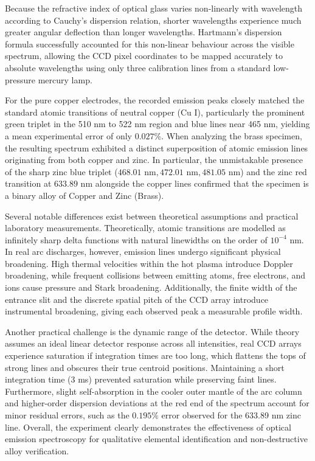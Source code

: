 \documentclass[12pt, a4paper]{article}
\begin{document}
Because the refractive index of optical glass varies non-linearly with wavelength according to Cauchy's dispersion relation, shorter wavelengths experience much greater angular deflection than longer wavelengths. Hartmann's dispersion formula successfully accounted for this non-linear behaviour across the visible spectrum, allowing the CCD pixel coordinates to be mapped accurately to absolute wavelengths using only three calibration lines from a standard low-pressure mercury lamp.

For the pure copper electrodes, the recorded emission peaks closely matched the standard atomic transitions of neutral copper (Cu I), particularly the prominent green triplet in the 510 nm to 522 nm region and blue lines near 465 nm, yielding a mean experimental error of only $0.027\%$. When analyzing the brass specimen, the resulting spectrum exhibited a distinct superposition of atomic emission lines originating from both copper and zinc. In particular, the unmistakable presence of the sharp zinc blue triplet ($468.01\text{ nm}, 472.01\text{ nm}, 481.05\text{ nm}$) and the zinc red transition at $633.89\text{ nm}$ alongside the copper lines confirmed that the specimen is a binary alloy of Copper and Zinc (Brass).

Several notable differences exist between theoretical assumptions and practical laboratory measurements. Theoretically, atomic transitions are modelled as infinitely sharp delta functions with natural linewidths on the order of $10^{-4}$ nm. In real arc discharges, however, emission lines undergo significant physical broadening. High thermal velocities within the hot plasma introduce Doppler broadening, while frequent collisions between emitting atoms, free electrons, and ions cause pressure and Stark broadening. Additionally, the finite width of the entrance slit and the discrete spatial pitch of the CCD array introduce instrumental broadening, giving each observed peak a measurable profile width.

Another practical challenge is the dynamic range of the detector. While theory assumes an ideal linear detector response across all intensities, real CCD arrays experience saturation if integration times are too long, which flattens the tops of strong lines and obscures their true centroid positions. Maintaining a short integration time (3 ms) prevented saturation while preserving faint lines. Furthermore, slight self-absorption in the cooler outer mantle of the arc column and higher-order dispersion deviations at the red end of the spectrum account for minor residual errors, such as the $0.195\%$ error observed for the 633.89 nm zinc line. Overall, the experiment clearly demonstrates the effectiveness of optical emission spectroscopy for qualitative elemental identification and non-destructive alloy verification.
\end{document}
